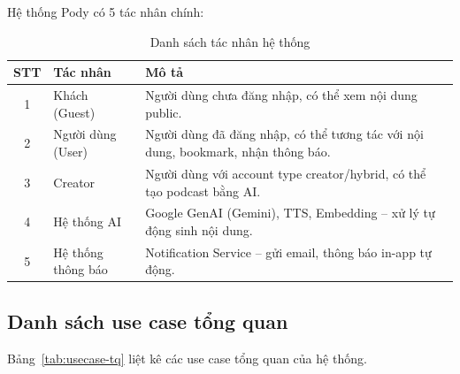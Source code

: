 \documentclass[14pt,a4paper,oneside]{extreport}
\begin{document}
Hệ thống Pody có 5 tác nhân chính:

\begin{table}[H]
\centering
\caption{Danh sách tác nhân hệ thống}
\label{tab:actors}
\renewcommand{\arraystretch}{1.3}
\small
\begin{tabularx}{\textwidth}{|c|l|X|}
\hline
\textbf{STT} & \textbf{Tác nhân} & \textbf{Mô tả} \\
\hline
1 & Khách (Guest) & Người dùng chưa đăng nhập, có thể xem nội dung public. \\
\hline
2 & Người dùng (User) & Người dùng đã đăng nhập, có thể tương tác với nội dung, bookmark, nhận thông báo. \\
\hline
3 & Creator & Người dùng với account type creator/hybrid, có thể tạo podcast bằng AI. \\
\hline
4 & Hệ thống AI & Google GenAI (Gemini), TTS, Embedding -- xử lý tự động sinh nội dung. \\
\hline
5 & Hệ thống thông báo & Notification Service -- gửi email, thông báo in-app tự động. \\
\hline
\end{tabularx}
\end{table}

\subsection{Danh sách use case tổng quan}

Bảng~\ref{tab:usecase-tq} liệt kê các use case tổng quan của hệ thống.
\end{document}
